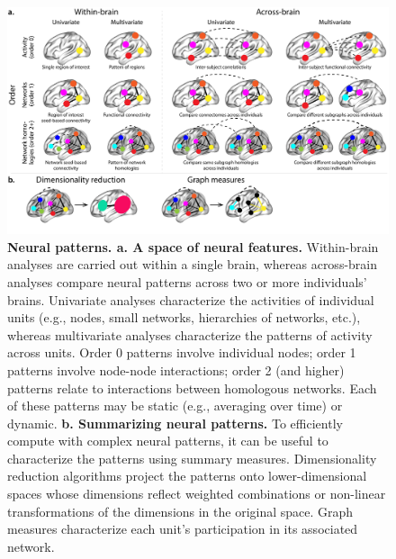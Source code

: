 \documentclass[english]{article}
\begin{document}
\begin{figure}
[tp]
  \centering
  \includegraphics[width=\textwidth]{figs/patterns}
  \caption{\textbf{Neural patterns. a. A space of neural features.}
    Within-brain analyses are carried out within a single brain,
    whereas across-brain analyses compare neural patterns across two
    or more individuals' brains.  Univariate analyses characterize the
    activities of individual units (e.g., nodes, small networks,
    hierarchies of networks, etc.), whereas multivariate analyses
    characterize the patterns of activity across units.  Order 0
    patterns involve individual nodes; order 1 patterns involve
    node-node interactions; order 2 (and higher) patterns relate to
    interactions between homologous networks.  Each of these patterns
    may be static (e.g., averaging over time) or dynamic.
  \textbf{b. Summarizing neural patterns.} To efficiently compute
    with complex neural patterns, it can be useful to characterize the
    patterns using summary measures.  Dimensionality reduction
    algorithms project the patterns onto lower-dimensional spaces
    whose dimensions reflect weighted combinations or non-linear
    transformations of the dimensions in the original space.  Graph
    measures characterize each unit's participation in its associated
    network.}
  \label{fig:patterns}

\end{figure}
\end{document}

